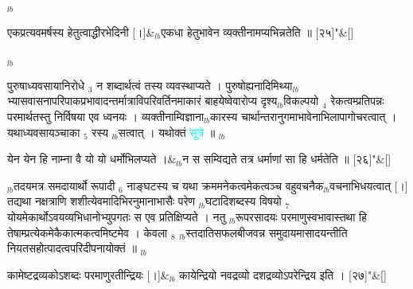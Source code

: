 \documentclass[article,12pt,a4paper]{memoir}%
\newcommand{\quotelemma}[1]{\textcolor{cyan}{#1}}
\newcounter{parCount}
\begin{document}
	{}
	\pend%
      {\tiny $_{lb}$}
	  \bigskip
	  \begingroup
	
	    
	    \stanza[\smallbreak]
	  एकप्रत्यवमर्षस्य हेतुत्वाद्धीरभेदिनी [।]&{\tiny $_{lb}$}एकधा हेतुभावेन व्यक्तीनामप्यभिन्नतेति ॥ [२५]{\normalfontlatin\large\qquad{}"}\&[\smallbreak]
	  
	  
	  
	  \endgroup
	{\tiny $_{lb}$}

	  
	  \pstart \leavevmode%
	पुरुषाध्यवसायानिरोधे {\tiny $_{3}$} न शब्दार्थत्वं तस्य व्यवस्थाप्यते । पुरुषोह्यनादिमिथ्या{\tiny $_{lb}$}भ्यासवासनापरिपाकप्रभावादन्तर्मात्राविपरिवर्तिनमाकारं बाहयेष्वेवारोप्य दृश्य{\tiny $_{lb}$}विकल्पयो {\tiny $_{4}$} रेकत्वम्प्रतिपन्नः परमार्थतस्तु निर्विषया एव ध्वनयः । व्यक्तीनाम्विज्ञाना{\tiny $_{lb}$}कारस्य चार्थान्तरानुगमाभावेनाभिलापागोचरत्वात् । यथाध्यवसायञ्चाका {\tiny $_{5}$} रस्य {\tiny $_{lb}$}सत्वात् । यथोक्तं \quotelemma{सूत्रे} ॥ {\tiny $_{lb}$} 
	    \pend%
	  
	    
	    \stanza[\smallbreak]
	  येन येन हि नाम्ना वै यो यो धर्मोभिलप्यते ।&{\tiny $_{lb}$}न स सम्विद्यते तत्र धर्माणां सा हि धर्मतेति ॥ [२६]{\normalfontlatin\large\qquad{}"}\&[\smallbreak]
	  
	  
	  
	    \pstart  \leavevmode%
	    \hphantom{.}
	   {\tiny $_{lb}$}तदयमत्र समदायार्थो रूपादी {\tiny $_{6}$} नाङ्घटस्य च यथा क्रममनेकत्वमेकत्वञ्च वहुवचनैक{\tiny $_{lb}$}वचनाभिधयत्वात् [।] तद्यथा नक्षत्राणि शशीत्येवमादिभिरनुमानाभासैः परेण {\tiny $_{lb}$}घटादिशब्दस्य विषयो {\tiny $_{7}$} योयमेकार्थोऽवयव्यभिधानोभ्युपगतः स एव प्रतिक्षिप्यते । नतु {\tiny $_{lb}$}रूपरसादयः परमाणुस्वभावास्तथा हि तेषाम्प्रत्येकमेकैकात्मकत्वमिष्टमेव । केवला {\tiny $_{8}$} {\tiny $_{lb}$}स्तदातिसफलबीजवन्न समुदायमासादयन्तीति नियतसहोत्पादत्वपरिदीपनायोक्तं ॥ {\tiny $_{lb}$} 
	    \pend%
	  
	    
	    \stanza[\smallbreak]
	  कामेष्टद्रव्यकोऽशब्दः परमाणुरतीन्द्रियः [।]&{\tiny $_{lb}$} \leavevmode{}कायेन्द्रियो नवद्रव्यो दशद्रव्योऽपरेन्द्रिय इति । [२७]{\normalfontlatin\large\qquad{}"}\&[\smallbreak]
	  
\end{document}
